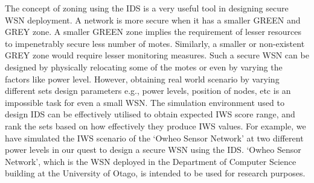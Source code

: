 \documentclass[conference,manuscript]{IEEEtran}
\newcommand{\notedme}[1]{\raisebox{0pt}[0pt][0pt]{\pdfcomment[open=true,color=blue]{#1}}}
\begin{document}
The concept of zoning using the IDS is a very useful tool in designing secure WSN deployment.
A network is more secure when it has a smaller GREEN and GREY zone.
A smaller GREEN zone implies the requirement of lesser resources to impenetrably secure less number of motes.
Similarly, a smaller or non-existent GREY zone would require lesser monitoring measures.
Such a secure WSN can be designed by physically relocating some of the motes or even by varying the factors like power level.
However, obtaining real world scenario by varying different sets design parameters e.g., power levels, position of nodes, etc is an impossible task for even a small WSN.
The simulation environment used to design IDS can be effectively utilised to obtain expected IWS score range, and rank the sets based on how effectively they produce IWS values. 
For example, we have simulated the IWS scenario of the `Owheo Sensor Network' at two different power levels in our quest to design a secure WSN using the IDS.
`Owheo Sensor Network', which is the WSN deployed in the Department of Computer Science building at the University of Otago, is intended to be used for research purposes.
\end{document}
